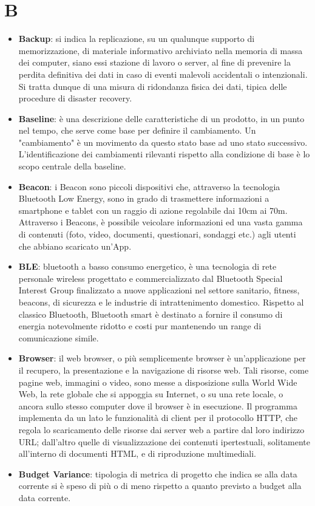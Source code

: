 \section{B}
\begin{itemize} 
	\item
	\textbf{Backup}: si indica la replicazione, su un qualunque supporto di memorizzazione, di materiale informativo archiviato nella memoria di massa dei computer, siano essi stazione di lavoro o server, al fine di prevenire la perdita definitiva dei dati in caso di eventi malevoli accidentali o intenzionali. Si tratta dunque di una misura di ridondanza fisica dei dati, tipica delle procedure di disaster recovery.
	\item
	\textbf{Baseline}: è una descrizione delle caratteristiche di un prodotto, in un punto nel tempo, che serve come base per definire il cambiamento. Un "cambiamento" è un movimento da questo stato base ad uno stato successivo. L'identificazione dei cambiamenti rilevanti rispetto alla condizione di base è lo scopo centrale della baseline.
	\item
	\textbf{Beacon}: i Beacon sono piccoli dispositivi che, attraverso la tecnologia Bluetooth Low Energy, sono in grado di trasmettere informazioni a smartphone e tablet con un raggio di azione regolabile dai 10cm ai 70m. Attraverso i Beacons, è possibile veicolare informazioni ed una vasta gamma di contenuti (foto, video, documenti, questionari, sondaggi etc.) agli utenti che abbiano scaricato un'App.
	\item
	\textbf{BLE}: bluetooth a basso consumo energetico, è una tecnologia di rete personale wireless progettato e commercializzato dal Bluetooth Special Interest Group finalizzato a nuove applicazioni nel settore sanitario, fitness, beacons, di sicurezza e le industrie di intrattenimento domestico. Rispetto al classico Bluetooth, Bluetooth smart è destinato a fornire il consumo di energia notevolmente ridotto e costi pur mantenendo un range di comunicazione simile.
	\item
	\textbf{Browser}: il web browser, o più semplicemente browser è un'applicazione per il recupero, la presentazione e la navigazione di risorse web. Tali risorse, come pagine web, immagini o video, sono messe a disposizione sulla World Wide Web, la rete globale che si appoggia su Internet, o su una rete locale, o ancora sullo stesso computer dove il browser è in esecuzione. Il programma implementa da un lato le funzionalità di client per il protocollo HTTP, che regola lo scaricamento delle risorse dai server web a partire dal loro indirizzo URL; dall'altro quelle di visualizzazione dei contenuti ipertestuali, solitamente all'interno di documenti HTML, e di riproduzione multimediali.
	\item
	\textbf{Budget Variance}: tipologia di metrica di progetto che indica se alla data corrente si è speso di più o di meno rispetto a quanto previsto a budget alla data corrente. 
	

\end{itemize}
